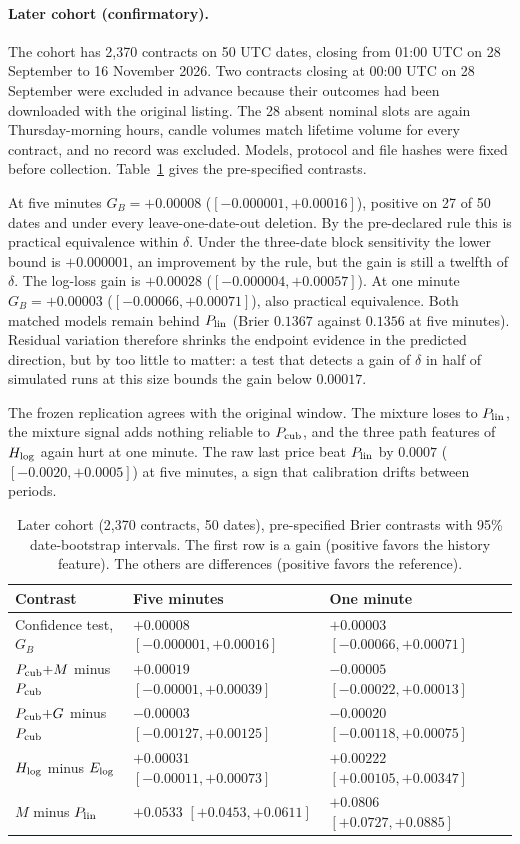 \documentclass[runningheads]{llncs}
\begin{document}
\paragraph{Later cohort (confirmatory).} The cohort has 2,370 contracts on 50 UTC dates, closing from 01:00 UTC on 28 September to 16 November 2026. Two contracts closing at 00:00 UTC on 28 September were excluded in advance because their outcomes had been downloaded with the original listing. The 28 absent nominal slots are again Thursday-morning hours, candle volumes match lifetime volume for every contract, and no record was excluded. Models, protocol and file hashes were fixed before collection. Table~\ref{tab:confirm} gives the pre-specified contrasts.

At five minutes $G_B=+0.00008$ ($[-0.000001,+0.00016]$), positive on 27 of 50 dates and under every leave-one-date-out deletion. By the pre-declared rule this is practical equivalence within $\delta$. Under the three-date block sensitivity the lower bound is $+0.000001$, an improvement by the rule, but the gain is still a twelfth of $\delta$. The log-loss gain is $+0.00028$ ($[-0.000004,+0.00057]$). At one minute $G_B=+0.00003$ ($[-0.00066,+0.00071]$), also practical equivalence. Both matched models remain behind $P_{\rm lin}$ (Brier $0.1367$ against $0.1356$ at five minutes). Residual variation therefore shrinks the endpoint evidence in the predicted direction, but by too little to matter: a test that detects a gain of $\delta$ in half of simulated runs at this size bounds the gain below $0.00017$.

The frozen replication agrees with the original window. The mixture loses to $P_{\rm lin}$, the mixture signal adds nothing reliable to $P_{\rm cub}$, and the three path features of $H_{\rm log}$ again hurt at one minute. The raw last price beat $P_{\rm lin}$ by $0.0007$ ($[-0.0020,+0.0005]$) at five minutes, a sign that calibration drifts between periods.

\begin{table}[t]
\caption{Later cohort (2,370 contracts, 50 dates), pre-specified Brier contrasts with 95\% date-bootstrap intervals. The first row is a gain (positive favors the history feature). The others are differences (positive favors the reference).}
\label{tab:confirm}
\centering\scriptsize
\begin{tabular}{@{}lll@{}}
\toprule
Contrast & Five minutes & One minute \\
\midrule
Confidence test, $G_B$ & $+0.00008$ $[-0.000001,+0.00016]$ & $+0.00003$ $[-0.00066,+0.00071]$ \\
$P_{\rm cub}{+}M$ minus $P_{\rm cub}$ & $+0.00019$ $[-0.00001,+0.00039]$ & $-0.00005$ $[-0.00022,+0.00013]$ \\
$P_{\rm cub}{+}G$ minus $P_{\rm cub}$ & $-0.00003$ $[-0.00127,+0.00125]$ & $-0.00020$ $[-0.00118,+0.00075]$ \\
$H_{\rm log}$ minus $E_{\rm log}$ & $+0.00031$ $[-0.00011,+0.00073]$ & $+0.00222$ $[+0.00105,+0.00347]$ \\
$M$ minus $P_{\rm lin}$ & $+0.0533$ $[+0.0453,+0.0611]$ & $+0.0806$ $[+0.0727,+0.0885]$ \\
\bottomrule
\end{tabular}
\end{table}
\end{document}
